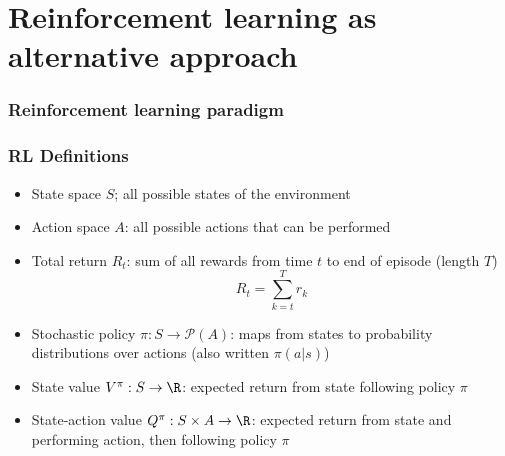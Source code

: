 \documentclass{beamer}
\begin{document}

\section{Reinforcement learning as alternative approach}

\begin{frame}
\frametitle{Reinforcement learning paradigm}


\begin{figure}
    \centering
    \label{fig:RL}
\end{figure}

\end{frame}

\begin{frame}
\frametitle{RL Definitions}

\begin{itemize}
    \item State space $S$; all possible states of the environment
    \item Action space $A$: all possible actions that can be performed
    \item Total return $R_t$: sum of all rewards from time $t$ to end of episode (length $T$)
    \begin{equation}\label{eq:return}
        R_t = \sum_{k=t}^T r_k
    \end{equation}
    \pause
    \item Stochastic policy $\pi: S \to \mathcal{P}(A)$:
        maps from states to probability distributions over actions (also written $\pi(a|s)$)
    \item State value $V^\pi:S \to \R$: expected return from state following policy $\pi$
    \item State-action value $Q^\pi: S \times A \to \R$: expected return from state and performing action, then following policy $\pi$
\end{itemize}

\end{frame}
\end{document}
